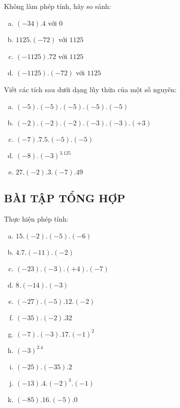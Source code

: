 \begin{bt}
\end{bt}   \begin{bt}
Không làm phép tính, hãy so sánh:
\begin{enumerate}[a)]
\item $(-34).4$ với $0$
\item $1125.(-72)$ với $1125$
\item $(-1125).72$ với $1125$
\item $(-1125).(-72)$ với $1125$
\end{enumerate}
\end{bt}   \begin{bt}
Viết các tích sau dưới dạng lũy thừa của một số nguyên:
 \begin{enumerate}[a)]
\item $(-5).(-5).(-5).(-5).(-5)$
\item $(-2).(-2).(-2).(-3).(-3).(+3)$
\item $(-7). 7 . 5 . (-5) . (-5)$
\item $(-8).(-3)^3.125$ 		
\item  $27.(-2).3.(-7).49$
 \end{enumerate}
\subsection{BÀI TẬP TỔNG HỢP}
\end{bt}   \begin{bt} 
Thực hiện phép tính:
\begin{multicols}{2}
\begin{enumerate}[a)]
\item $15.(-2).(-5).(-6)$
\item $4.7.(-11).(-2)$
\item $(-23).(-3).(+4).(-7)$
\item $8.(-14).(-3)$
\item $(-27).(-5).12.(-2)$
\item $(-35).(-2).32$
\item $(-7).(-3).17.(-1)^2$
\item $(-3)^2.4$
\item $(-25). (-35).2$
\item $(-13).4.(-2)^3.(-1)$
\item $(-85).16.(-5).0$
 \end{enumerate}
 \end{multicols}
 

\end{bt}

